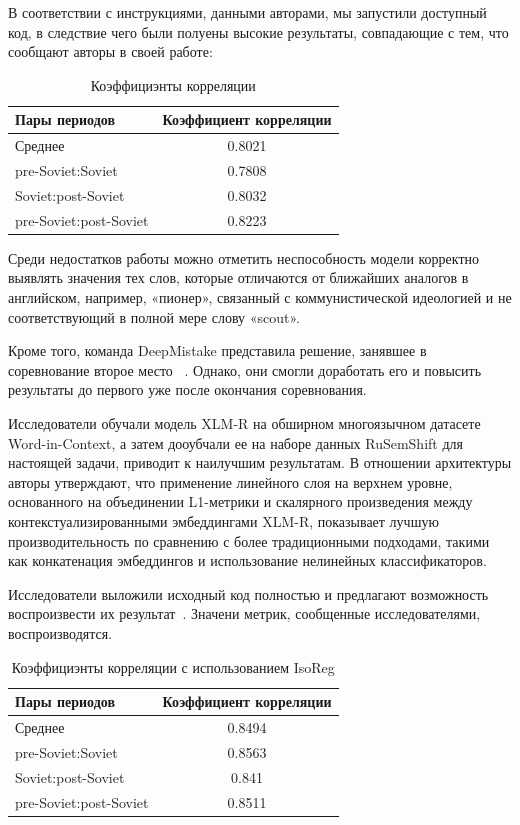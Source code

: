 \documentclass[LI,VKR]{HSEUniversity}
\begin{document}
В соответствии с инструкциями, данными авторами, мы запустили доступный код,
в следствие чего были полуены высокие результаты, совпадающие с тем, что сообщают
авторы в своей работе:

\begin{table}[H]
\centering
\caption{Коэффициэнты корреляции}
\begin{tabular}{lc}
\hline
Пары периодов                  & Коэффициент корреляции \\
\hline
Среднее            & 0.8021                  \\
pre-Soviet:Soviet           & 0.7808                  \\
Soviet:post-Soviet          & 0.8032                  \\
pre-Soviet:post-Soviet      & 0.8223                  \\
\hline
\end{tabular}
\end{table}

Среди недостатков работы можно отметить неспособность модели корректно выявлять
значения тех слов, которые отличаются от ближайших аналогов в английском, например,
«пионер», связанный с коммунистической идеологией и не соответствующий в полной мере
слову «scout».

Кроме того, команда DeepMistake представила решение, занявшее в соревнование второе место
~\cite{DeepMistake}.
Однако, они смогли доработать его и повысить результаты до первого уже после окончания
соревнования.

Исследователи обучали модель XLM-R на обширном многоязычном датасете Word-in-Context,
а затем дооубчали ее на наборе данных RuSemShift для настоящей задачи,
приводит к наилучшим результатам.
В отношении архитектуры авторы утверждают, что применение линейного слоя на верхнем уровне,
основанного на объединении L1-метрики и скалярного произведения между контекстуализированными
эмбеддингами XLM-R, показывает лучшую производительность по сравнению с
более традиционными подходами, такими как конкатенация эмбеддингов и
использование нелинейных классификаторов.

Исследователи выложили исходный код полностью и предлагают возможность воспроизвести их
результат~\cite{DeepMistakeGitHub}.
Значени метрик, сообщенные исследователями, воспроизводятся.

\begin{table}[H]
\centering
\caption{Коэффициэнты корреляции с использованием IsoReg}
\begin{tabular}{lc}
\hline
Пары периодов                  & Коэффициент корреляции \\
\hline
Среднее            & 0.8494                  \\
pre-Soviet:Soviet           & 0.8563                  \\
Soviet:post-Soviet          & 0.841                  \\
pre-Soviet:post-Soviet      & 0.8511                  \\
\hline
\end{tabular}
\end{table}
\end{document}
